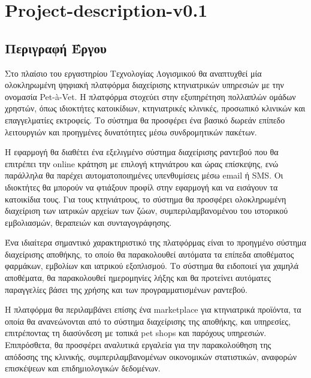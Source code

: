 \documentclass[12pt,a4paper,twoside]{book}
\renewcommand{\headrulewidth}{0pt} %
\renewcommand{\headrulewidth}{0pt}
\let\oldtableofcontents\tableofcontents
\renewcommand{\tableofcontents}{%
    \clearpage
    \thispagestyle{empty}
    \pagestyle{tocstyle}
    \oldtableofcontents %
    \clearpage
    \pagestyle{fancy}
    \fancyhead[LE]{\thepage} %
    \fancyhead[CE]{\leftmark} %
    \fancyhead[RE]{ΚΕΦ. \thechapter} %

    \fancyhead[LO]{\thesection} %
    \fancyhead[CO]{\rightmark} %
    \fancyhead[RO]{\thepage} %

    \renewcommand{\headrulewidth}{0.4pt} %

    \renewcommand{\chaptermark}[1]{\markboth{##1}{}}
    \renewcommand{\sectionmark}[1]{\markright{##1}}
}
\begin{document}
\tableofcontents

\printindex

\chapter{Project-description-v0.1}

\section{Περιγραφή Έργου}

Στο πλαίσιο του εργαστηρίου Τεχνολογίας Λογισμικού θα αναπτυχθεί μία ολοκληρωμένη ψηφιακή πλατφόρμα διαχείρισης κτηνιατρικών υπηρεσιών με την ονομασία Pet-à-Vet. Η πλατφόρμα στοχεύει στην εξυπηρέτηση πολλαπλών ομάδων χρηστών, όπως ιδιοκτήτες κατοικίδιων, κτηνιατρικές κλινικές, προσωπικό κλινικών και επαγγελματίες εκτροφείς. Το σύστημα θα προσφέρει ένα βασικό δωρεάν επίπεδο λειτουργιών και προηγμένες δυνατότητες μέσω συνδρομητικών πακέτων. %

Η εφαρμογή θα διαθέτει ένα εξελιγμένο σύστημα διαχείρισης ραντεβού που θα επιτρέπει την online κράτηση με επιλογή κτηνιάτρου και ώρας επίσκεψης, ενώ παράλληλα θα παρέχει αυτοματοποιημένες υπενθυμίσεις μέσω email ή SMS. Οι ιδιοκτήτες θα μπορούν να φτιάξουν προφίλ στην εφαρμογή και να εισάγουν τα κατοικίδια τους. Για τους κτηνιάτρους, το σύστημα θα προσφέρει ολοκληρωμένη διαχείριση των ιατρικών αρχείων των ζώων, συμπεριλαμβανομένου του ιστορικού εμβολιασμών, θεραπειών και συνταγογράφησης.%

Ένα ιδιαίτερα σημαντικό χαρακτηριστικό της πλατφόρμας είναι το προηγμένο σύστημα διαχείρισης αποθήκης, το οποίο θα παρακολουθεί αυτόματα τα επίπεδα αποθέματος φαρμάκων, εμβολίων και ιατρικού εξοπλισμού. Το σύστημα θα ειδοποιεί για χαμηλά αποθέματα, θα παρακολουθεί ημερομηνίες λήξης και θα προτείνει αυτόματες παραγγελίες βάσει της χρήσης και των προγραμματισμένων ραντεβού. %

Η πλατφόρμα θα περιλαμβάνει επίσης ένα marketplace για κτηνιατρικά προϊόντα, τα οποία θα ανανεώνονται από το σύστημα διαχείρισης της αποθήκης, και υπηρεσίες, επιτρέποντας τη διασύνδεση με τοπικά pet shops και παρόχους υπηρεσιών. Επιπρόσθετα, θα προσφέρει αναλυτικά εργαλεία για την παρακολούθηση της απόδοσης της κλινικής, συμπεριλαμβανομένων οικονομικών στατιστικών, αναφορών επισκέψεων και επιδημιολογικών δεδομένων. %
\end{document}

